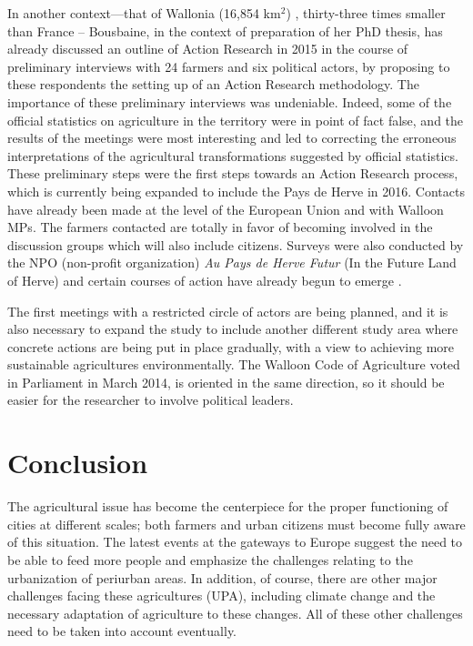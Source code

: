 \documentclass[10pt,a4paper]{article}
\begin{document}
\begin{multicols}{2}
In another context---that of Wallonia (16,854 km$^2$) \citep{r25}, thirty-three times smaller than France – Bousbaine, in the context of preparation of her PhD thesis, has already discussed an outline of Action Research in 2015 in the course of preliminary interviews with 24 farmers and six political actors, by proposing to these respondents the setting up of an Action Research methodology. The importance of these preliminary interviews was undeniable. Indeed, some of the official statistics on agriculture in the territory were in point of fact false, and the results of the meetings were most interesting and led to correcting the erroneous interpretations of the agricultural transformations suggested by official statistics. These preliminary steps were the first steps towards an Action Research process, which is currently being expanded to include the Pays de Herve in 2016. Contacts have already been made at the level of the European Union and with Walloon MPs. The farmers contacted are totally in favor of becoming involved in the discussion groups which will also include citizens.  Surveys were also conducted by the NPO (non-profit organization) \textit{Au Pays de Herve Futur} (In the Future Land of Herve) and certain courses of action have already begun to emerge \citep{r25}.

The first meetings with a restricted circle of actors are being planned, and it is also necessary to expand the study to include another different study area where concrete actions are being put in place gradually, with a view to achieving more sustainable agricultures environmentally. The Walloon Code of Agriculture voted in Parliament in March 2014, is oriented in the same direction, so it should be easier for the researcher to involve political leaders.

\section{Conclusion}
\noindent The agricultural issue has become the centerpiece for the proper functioning of cities at different scales; both farmers and urban citizens must become fully aware of this situation. The latest events at the gateways to Europe suggest the need to be able to feed more people and emphasize the challenges relating to the urbanization of periurban areas. In addition, of course, there are other major challenges facing these agricultures (UPA), including climate change and the necessary adaptation of agriculture to these changes. All of these other challenges need to be taken into account eventually.


\end{multicols}
\end{document}
